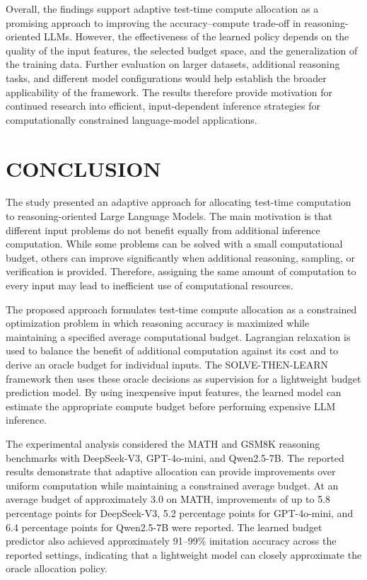 \documentclass[12pt,a4paper,titlepage]{report}
\begin{document}
Overall, the findings support adaptive test-time compute allocation as a promising approach to improving the accuracy--compute trade-off in reasoning-oriented LLMs. However, the effectiveness of the learned policy depends on the quality of the input features, the selected budget space, and the generalization of the training data. Further evaluation on larger datasets, additional reasoning tasks, and different model configurations would help establish the broader applicability of the framework. The results therefore provide motivation for continued research into efficient, input-dependent inference strategies for computationally constrained language-model applications.

\chapter{CONCLUSION}

The study presented an adaptive approach for allocating test-time computation to reasoning-oriented Large Language Models. The main motivation is that different input problems do not benefit equally from additional inference computation. While some problems can be solved with a small computational budget, others can improve significantly when additional reasoning, sampling, or verification is provided. Therefore, assigning the same amount of computation to every input may lead to inefficient use of computational resources.

The proposed approach formulates test-time compute allocation as a constrained optimization problem in which reasoning accuracy is maximized while maintaining a specified average computational budget. Lagrangian relaxation is used to balance the benefit of additional computation against its cost and to derive an oracle budget for individual inputs. The SOLVE-THEN-LEARN framework then uses these oracle decisions as supervision for a lightweight budget prediction model. By using inexpensive input features, the learned model can estimate the appropriate compute budget before performing expensive LLM inference.

The experimental analysis considered the MATH and GSM8K reasoning benchmarks with DeepSeek-V3, GPT-4o-mini, and Qwen2.5-7B. The reported results demonstrate that adaptive allocation can provide improvements over uniform computation while maintaining a constrained average budget. At an average budget of approximately 3.0 on MATH, improvements of up to 5.8 percentage points for DeepSeek-V3, 5.2 percentage points for GPT-4o-mini, and 6.4 percentage points for Qwen2.5-7B were reported. The learned budget predictor also achieved approximately 91--99\% imitation accuracy across the reported settings, indicating that a lightweight model can closely approximate the oracle allocation policy.
\end{document}
